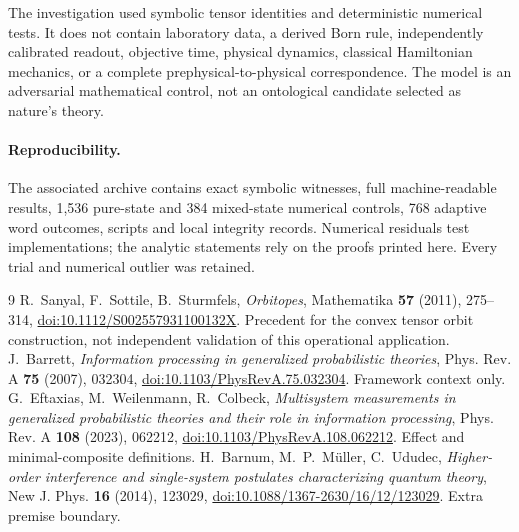 \documentclass[10.5pt,letterpaper]{article}
\begin{document}
The investigation used symbolic tensor identities and deterministic numerical tests. It does not contain laboratory data, a derived Born rule, independently calibrated readout, objective time, physical dynamics, classical Hamiltonian mechanics, or a complete prephysical-to-physical correspondence. The model is an adversarial mathematical control, not an ontological candidate selected as nature's theory.

\paragraph{Reproducibility.} The associated archive contains exact symbolic witnesses, full machine-readable results, 1,536 pure-state and 384 mixed-state numerical controls, 768 adaptive word outcomes, scripts and local integrity records. Numerical residuals test implementations; the analytic statements rely on the proofs printed here. Every trial and numerical outlier was retained.

\begin{thebibliography}{9}\small
{} R.~Sanyal, F.~Sottile, B.~Sturmfels, \emph{Orbitopes}, Mathematika \textbf{57} (2011), 275--314, \href{https://doi.org/10.1112/S002557931100132X}{doi:10.1112/S002557931100132X}. Precedent for the convex tensor orbit construction, not independent validation of this operational application.
 J.~Barrett, \emph{Information processing in generalized probabilistic theories}, Phys. Rev. A \textbf{75} (2007), 032304, \href{https://doi.org/10.1103/PhysRevA.75.032304}{doi:10.1103/PhysRevA.75.032304}. Framework context only.
 G.~Eftaxias, M.~Weilenmann, R.~Colbeck, \emph{Multisystem measurements in generalized probabilistic theories and their role in information processing}, Phys. Rev. A \textbf{108} (2023), 062212, \href{https://doi.org/10.1103/PhysRevA.108.062212}{doi:10.1103/PhysRevA.108.062212}. Effect and minimal-composite definitions.
 H.~Barnum, M.~P.~M\"uller, C.~Ududec, \emph{Higher-order interference and single-system postulates characterizing quantum theory}, New J. Phys. \textbf{16} (2014), 123029, \href{https://doi.org/10.1088/1367-2630/16/12/123029}{doi:10.1088/1367-2630/16/12/123029}. Extra premise boundary.
\end{thebibliography}
\end{document}

